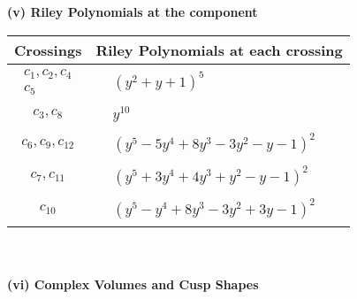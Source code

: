 \documentclass[1p]{elsarticle_modified}
\theoremstyle{definition}
\begin{document}
\newpage\renewcommand{\arraystretch}{1}
\flushleft \textbf{(v) Riley Polynomials at the component}\newline \\
\begin{tabular}{m{50pt}|m{274pt}}
Crossings & \hspace{64pt}Riley Polynomials at each crossing \\
\hline $$\begin{aligned}c_{1},c_{2},c_{4}\\c_{5}\end{aligned}$$&$\begin{aligned}
&(y^2+y+1)^5
\end{aligned}$\\
\hline $$\begin{aligned}c_{3},c_{8}\end{aligned}$$&$\begin{aligned}
&y^{10}
\end{aligned}$\\
\hline $$\begin{aligned}c_{6},c_{9},c_{12}\end{aligned}$$&$\begin{aligned}
&(y^5-5 y^4+8 y^3-3 y^2- y-1)^2
\end{aligned}$\\
\hline $$\begin{aligned}c_{7},c_{11}\end{aligned}$$&$\begin{aligned}
&(y^5+3 y^4+4 y^3+y^2- y-1)^2
\end{aligned}$\\
\hline $$\begin{aligned}c_{10}\end{aligned}$$&$\begin{aligned}
&(y^5- y^4+8 y^3-3 y^2+3 y-1)^2
\end{aligned}$\\
\hline
\end{tabular}\\~\\
\newpage\flushleft \textbf{(vi) Complex Volumes and Cusp Shapes}
\end{document}
